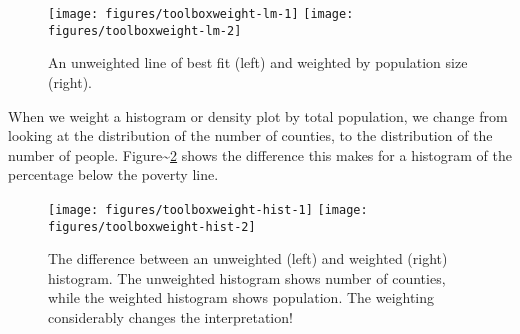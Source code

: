 \begin{Shaded}
\begin{Highlighting}[]
\StringTok{ }\NormalTok{(}  \NormalTok{)}
 \StringTok{ }
 
    \StringTok{ }
\end{Highlighting}
\end{Shaded}

\begin{figure}
\texttt{[image: figures/toolboxweight-lm-1]} \texttt{[image: figures/toolboxweight-lm-2]} \caption{An unweighted line of best fit (left) and weighted by population size (right).\label{fig:weight-lm}}
\end{figure}

When we weight a histogram or density plot by total population, we
change from looking at the distribution of the number of counties, to
the distribution of the number of people.
Figure\textasciitilde{}\ref{fig:weight-hist} shows the difference this
makes for a histogram of the percentage below the poverty line.

\begin{Shaded}
\begin{Highlighting}[]
  \NormalTok{)}
  
   \NormalTok{) +}\StringTok{ }\NormalTok{(}\NormalTok{)}
\end{Highlighting}
\end{Shaded}

\begin{figure}
\texttt{[image: figures/toolboxweight-hist-1]} \texttt{[image: figures/toolboxweight-hist-2]} \caption{The difference between an unweighted (left) and weighted (right) histogram. The unweighted histogram shows number of counties, while the weighted histogram shows population. The weighting considerably changes the interpretation!\label{fig:weight-hist}}
\end{figure}

